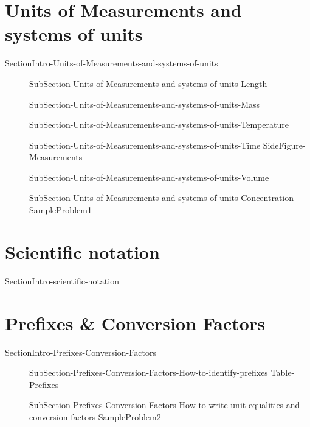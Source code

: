 \documentclass[main.tex]{subfiles}
\newcommand\chapterlabel{Ch-measurements}\setcounter{figurenewcounter}{0}\setcounter{tablenewcounter}{0}\setcounter{formulanewcounter}{0}\chapterpicture{../{\chapterlabel}/figure1}\chapterpicturelabel{PngImg}
\begin{document}
\section{Units of Measurements and systems of units}
{SectionIntro-Units-of-Measurements-and-systems-of-units}
\sloppy\begin{description}
\item[]{SubSection-Units-of-Measurements-and-systems-of-units-Length}
\item[]{SubSection-Units-of-Measurements-and-systems-of-units-Mass}
\item[]{SubSection-Units-of-Measurements-and-systems-of-units-Temperature}
\item[]{SubSection-Units-of-Measurements-and-systems-of-units-Time}
{SideFigure-Measurements}
\item[]{SubSection-Units-of-Measurements-and-systems-of-units-Volume}
\item[]{SubSection-Units-of-Measurements-and-systems-of-units-Concentration}
{SampleProblem1}
\end{description}


\section{Scientific notation} {SectionIntro-scientific-notation}
\section{Prefixes \& Conversion Factors}
{SectionIntro-Prefixes-Conversion-Factors}
\sloppy\begin{description}
\item[]{SubSection-Prefixes-Conversion-Factors-How-to-identify-prefixes}
{Table-Prefixes}
\item[]{SubSection-Prefixes-Conversion-Factors-How-to-write-unit-equalities-and-conversion-factors}
{SampleProblem2}
\end{description}
\end{document}
